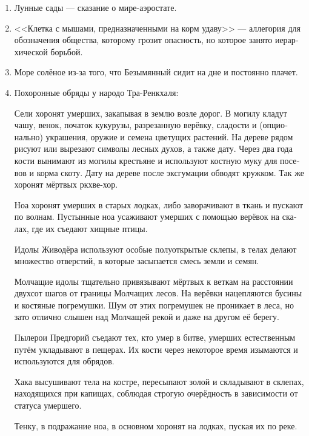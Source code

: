 \documentclass[a4paper,12pt,fleqn]{book}\usepackage{cooltooltips}\usepackage{polyglossia}\setdefaultlanguage[babelshorthands=true]{russian}\setotherlanguage{english}\defaultfontfeatures{Ligatures=TeX,Mapping=tex-text} \usepackage{xcolor}\definecolor{lightgray}{HTML}{bbbbbb}\color{lightgray}\newcommand{\ml}[3]{\textenglish{\textcolor{black}{#3}}}
\begin{document}
{\begin{enumerate}
<<Проблема неживых планет>> --- второй парадокс.
Почему жизнь не зарождается на всех планетах, ведь тогда плотность сознания была бы выше?
Парадокс был решён после разработки шкалы Яо.

\item Лунные сады --- сказание о мире-аэростате.

\item <<Клетка с мышами, предназначенными на корм удаву>> --- аллегория для обозначения общества, которому грозит опасность, но которое занято иерархической борьбой.

\item Море солёное из-за того, что Безымянный сидит на дне и постоянно плачет.

\item Похоронные обряды у народо Тра-Ренкхаля:

Сели хоронят умерших, закапывая в землю возле дорог.
В могилу кладут чашу, венок, початок кукурузы, разрезанную верёвку, сладости и (опционально) украшения, оружие и семена цветущих растений.
На дереве рядом рисуют или вырезают символы лесных духов, а также дату.
Через два года кости вынимают из могилы крестьяне и используют костную муку для посевов и корма скоту.
Дату на дереве после эксгумации обводят кружком.
Так же хоронят мёртвых ркхве-хор.

Ноа хоронят умерших в старых лодках, либо заворачивают в ткань и пускают по волнам.
Пустынные ноа усаживают умерших с помощью верёвок на скалах, где их съедают хищные птицы.

Идолы Живодёра используют особые полуоткрытые склепы, в телах делают множество отверстий, в которые засыпается смесь земли и семян.

Молчащие идолы тщательно привязывают мёртвых к веткам на расстоянии двухсот шагов от границы Молчащих лесов.
На верёвки нацепляются бусины и костяные погремушки.
Шум от этих погремушек не проникает в леса, но зато отлично слышен над Молчащей рекой и даже на другом её берегу.

Пылерои Предгорий съедают тех, кто умер в битве, умерших естественным путём укладывают в пещерах.
Их кости через некоторое время изымаются и используются для обрядов.

Хака высушивают тела на костре, пересыпают золой и складывают в склепах, находящихся при капищах, соблюдая строгую очерёдность в зависимости от статуса умершего.

Тенку, в подражание ноа, в основном хоронят на лодках, пуская их по реке.


\end{enumerate}}
\end{document}
